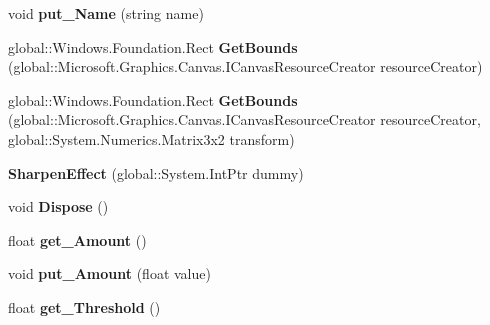 \begin{DoxyCompactItemize}
void {\bfseries put\+\_\+\+Name} (string name)
\item 
\mbox{\label{class_microsoft_1_1_graphics_1_1_canvas_1_1_effects_1_1_sharpen_effect_a79a03d434e2e48956d003964879ce65c}} 
global\+::\+Windows.\+Foundation.\+Rect {\bfseries Get\+Bounds} (global\+::\+Microsoft.\+Graphics.\+Canvas.\+I\+Canvas\+Resource\+Creator resource\+Creator)
\item 
\mbox{\label{class_microsoft_1_1_graphics_1_1_canvas_1_1_effects_1_1_sharpen_effect_a54df6548305c2f7ddeba7230f7fff008}} 
global\+::\+Windows.\+Foundation.\+Rect {\bfseries Get\+Bounds} (global\+::\+Microsoft.\+Graphics.\+Canvas.\+I\+Canvas\+Resource\+Creator resource\+Creator, global\+::\+System.\+Numerics.\+Matrix3x2 transform)
\item 
\mbox{\label{class_microsoft_1_1_graphics_1_1_canvas_1_1_effects_1_1_sharpen_effect_aa2c447cd17b2262cd288cbd0ecd66538}} 
{\bfseries Sharpen\+Effect} (global\+::\+System.\+Int\+Ptr dummy)
\item 
\mbox{\label{class_microsoft_1_1_graphics_1_1_canvas_1_1_effects_1_1_sharpen_effect_ab80afd02393c881baccb9ee076f0e68a}} 
void {\bfseries Dispose} ()
\item 
\mbox{\label{class_microsoft_1_1_graphics_1_1_canvas_1_1_effects_1_1_sharpen_effect_aa474bc9966d9aebafd4d25b60af032b6}} 
float {\bfseries get\+\_\+\+Amount} ()
\item 
\mbox{\label{class_microsoft_1_1_graphics_1_1_canvas_1_1_effects_1_1_sharpen_effect_aeee519576168a556c0566065630c0937}} 
void {\bfseries put\+\_\+\+Amount} (float value)
\item 
\mbox{\label{class_microsoft_1_1_graphics_1_1_canvas_1_1_effects_1_1_sharpen_effect_a0320c466d500b7944352011eb677edc0}} 
float {\bfseries get\+\_\+\+Threshold} ()

\end{DoxyCompactItemize}
